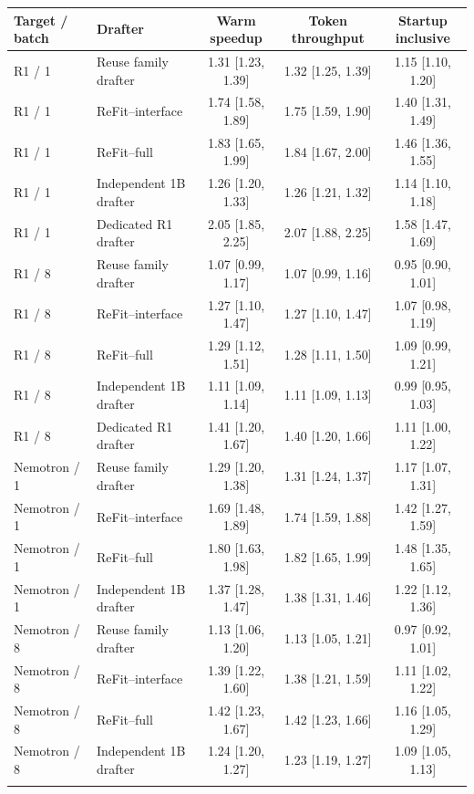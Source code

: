 \begin{tabular}{@{}llccc@{}}
\toprule
Target / batch & Drafter & Warm speedup & Token throughput & Startup inclusive \\
\midrule
R1 / 1 & Reuse family drafter & 1.31 [1.23, 1.39] & 1.32 [1.25, 1.39] & 1.15 [1.10, 1.20] \\
R1 / 1 & ReFit--interface & 1.74 [1.58, 1.89] & 1.75 [1.59, 1.90] & 1.40 [1.31, 1.49] \\
R1 / 1 & ReFit--full & 1.83 [1.65, 1.99] & 1.84 [1.67, 2.00] & 1.46 [1.36, 1.55] \\
R1 / 1 & Independent 1B drafter & 1.26 [1.20, 1.33] & 1.26 [1.21, 1.32] & 1.14 [1.10, 1.18] \\
R1 / 1 & Dedicated R1 drafter & 2.05 [1.85, 2.25] & 2.07 [1.88, 2.25] & 1.58 [1.47, 1.69] \\
\addlinespace[2pt]
R1 / 8 & Reuse family drafter & 1.07 [0.99, 1.17] & 1.07 [0.99, 1.16] & 0.95 [0.90, 1.01] \\
R1 / 8 & ReFit--interface & 1.27 [1.10, 1.47] & 1.27 [1.10, 1.47] & 1.07 [0.98, 1.19] \\
R1 / 8 & ReFit--full & 1.29 [1.12, 1.51] & 1.28 [1.11, 1.50] & 1.09 [0.99, 1.21] \\
R1 / 8 & Independent 1B drafter & 1.11 [1.09, 1.14] & 1.11 [1.09, 1.13] & 0.99 [0.95, 1.03] \\
R1 / 8 & Dedicated R1 drafter & 1.41 [1.20, 1.67] & 1.40 [1.20, 1.66] & 1.11 [1.00, 1.22] \\
\addlinespace[2pt]
Nemotron / 1 & Reuse family drafter & 1.29 [1.20, 1.38] & 1.31 [1.24, 1.37] & 1.17 [1.07, 1.31] \\
Nemotron / 1 & ReFit--interface & 1.69 [1.48, 1.89] & 1.74 [1.59, 1.88] & 1.42 [1.27, 1.59] \\
Nemotron / 1 & ReFit--full & 1.80 [1.63, 1.98] & 1.82 [1.65, 1.99] & 1.48 [1.35, 1.65] \\
Nemotron / 1 & Independent 1B drafter & 1.37 [1.28, 1.47] & 1.38 [1.31, 1.46] & 1.22 [1.12, 1.36] \\
\addlinespace[2pt]
Nemotron / 8 & Reuse family drafter & 1.13 [1.06, 1.20] & 1.13 [1.05, 1.21] & 0.97 [0.92, 1.01] \\
Nemotron / 8 & ReFit--interface & 1.39 [1.22, 1.60] & 1.38 [1.21, 1.59] & 1.11 [1.02, 1.22] \\
Nemotron / 8 & ReFit--full & 1.42 [1.23, 1.67] & 1.42 [1.23, 1.66] & 1.16 [1.05, 1.29] \\
Nemotron / 8 & Independent 1B drafter & 1.24 [1.20, 1.27] & 1.23 [1.19, 1.27] & 1.09 [1.05, 1.13] \\
\addlinespace[2pt]
\bottomrule
\end{tabular}
